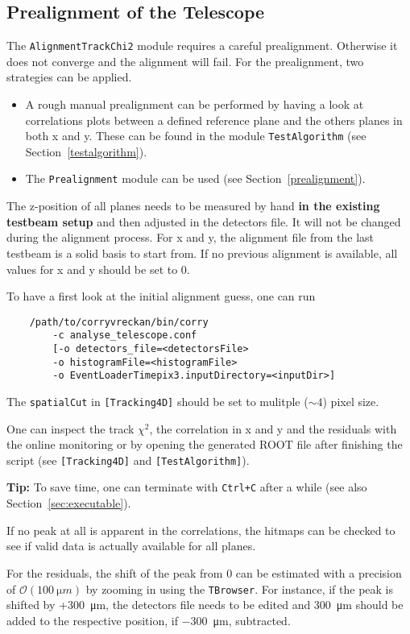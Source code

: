 \subsection*{Prealignment of the Telescope}
The \texttt{AlignmentTrackChi2} module requires a careful prealignment. Otherwise it does not converge and the alignment will fail.
For the prealignment, two strategies can be applied.
\begin{itemize}
\item A rough manual prealignment can be performed by having a look at correlations plots between a defined reference plane and the others planes in both x and y.
These can be found in the module \texttt{TestAlgorithm} (see Section~\ref{testalgorithm}).
\item The \texttt{Prealignment} module can be used (see Section~\ref{prealignment}).
\end{itemize}

The z-position of all planes needs to be measured by hand \textbf{in the existing testbeam setup} and then adjusted in the detectors file. 
It will not be changed during the alignment process.
For x and y, the alignment file from the last testbeam is a solid basis to start from.
If no previous alignment is available, all values for x and y should be set to 0.

To have a first look at the initial alignment guess, one can run
\begin{verbatim}
    /path/to/corryvreckan/bin/corry 
        -c analyse_telescope.conf
    	[-o detectors_file=<detectorsFile> 
    	-o histogramFile=<histogramFile> 
    	-o EventLoaderTimepix3.inputDirectory=<inputDir>]
\end{verbatim}

The \texttt{spatialCut} in \texttt{[Tracking4D]} should be set to mulitple ($\sim4$) pixel size.

One can inspect the track $\chi^2$, the correlation in x and y and the residuals with the online monitoring or by opening the generated ROOT file after finishing the script (see \texttt{[Tracking4D]} and \texttt{[TestAlgorithm]}).

\textbf{Tip:} To save time, one can terminate \corry with \texttt{Ctrl+C} after a while (see also Section~\ref{sec:executable}).

If no peak at all is apparent in the correlations, the hitmaps can be checked to see if valid data is actually available for all planes.

For the residuals, the shift of the peak from 0 can be estimated with a precision of $\mathcal{O}(\SI{100}{\micro m})$ by zooming in using the \texttt{TBrowser}.
For instance, if the peak is shifted by +\SI{+300}{\micro m}, the detectors file needs to be edited and \SI{+300}{\micro m} should be added to the respective position, if \SI{-300}{\micro m}, subtracted.

